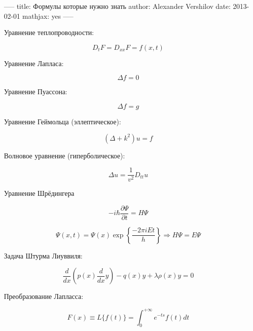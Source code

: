 -----
title: Формулы которые нужно знать
author: Alexander Vershilov
date: 2013-02-01
mathjax: yes
-----


Уравнение теплопроводности:

$$ D_t F = D_{xx} F = f(x,t) $$

Уравнение Лапласа:

$$ \Delta f = 0 $$

Уравнение Пуассона:

$$ \Delta f = g $$

Уравнение Геймольца (эллептическое):

$$ (\Delta + k^2) u = f $$

Волновое уравнение (гиперболическое):

$$ \Delta u = \frac{1}{v^2} D_{tt} u $$

Уравнение Шрёдингера

$$ -i \hbar \frac{\partial \Psi}{\partial t} = H \Psi $$

$$ \Psi(x,t) = \Psi(x) \exp\left\{ \frac{-2\pi i E t}{h}\right\} \Rightarrow H\Psi = E\Psi$$

Задача Штурма Лиуввиля:

$$ \frac{d}{dx} \left( p(x) \frac{d}{dx} y \right) - q(x)y+\lambda\rho(x)y=0 $$

Преобразование Лапласса:

$$ F(x) \equiv L\{f(t)\} = \int_0^{+\infty}e^{-ts}f(t)dt$$





